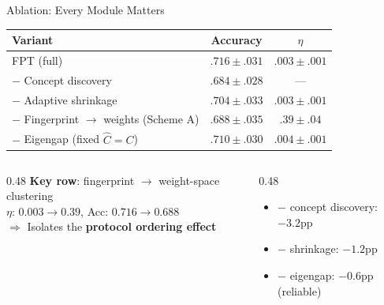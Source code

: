 \documentclass[aspectratio=169,11pt]{beamer}
\begin{document}
\begin{frame}{Ablation: Every Module Matters}

\centering
{\small
\begin{tabular}{@{}lcc@{}}
\toprule
Variant & Accuracy & $\eta$ \\
\midrule
FPT (full) & $.716 \pm .031$ & $.003 \pm .001$ \\
\quad $-$ Concept discovery & $.684 \pm .028$ & --- \\
\quad $-$ Adaptive shrinkage & $.704 \pm .033$ & $.003 \pm .001$ \\
\quad $-$ Fingerprint $\to$ weights \textcolor{cA}{(Scheme A)} & $.688 \pm .035$ & \textcolor{cA}{$.39 \pm .04$} \\
\quad $-$ Eigengap (fixed $\hat{C} {=} C$) & $.710 \pm .030$ & $.004 \pm .001$ \\
\bottomrule
\end{tabular}
}

\vspace{2pt}
\begin{columns}[T]
\begin{column}{0.48\textwidth}
\textbf{Key row}: fingerprint $\to$ weight-space clustering\\
$\eta$: $0.003 \to 0.39$, Acc: $0.716 \to 0.688$\\[2pt]
\textcolor{cA}{$\Rightarrow$ Isolates the \textbf{protocol ordering effect}}
\end{column}
\begin{column}{0.48\textwidth}
\begin{itemize}\setlength\itemsep{0pt}
  \item $-$ concept discovery: $-3.2$pp
  \item $-$ shrinkage: $-1.2$pp
  \item $-$ eigengap: $-0.6$pp (reliable)
\end{itemize}
\end{column}
\end{columns}
\end{frame}
\end{document}
